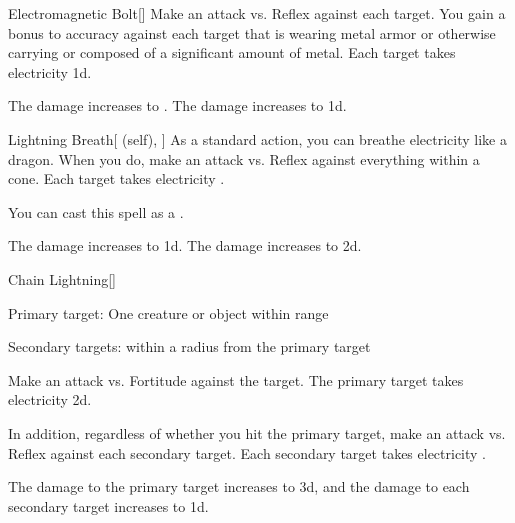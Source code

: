 \lowercase{\hypertarget{spell:Electromagnetic Bolt}{}}\label{spell:Electromagnetic Bolt}
\begin{freeability}[Rank 4]{\hypertarget{spell:Electromagnetic Bolt}{Electromagnetic Bolt}}[]
Make an attack vs. Reflex against each target.
You gain a  bonus to accuracy against each target that is wearing metal armor or otherwise carrying or composed of a significant amount of metal.
\hit Each target takes electricity  \minus1d.

\rankline
{} The damage increases to .
 The damage increases to  \plus1d.

\end{freeability}
\vspace{0.25em}



\lowercase{\hypertarget{spell:Lightning Breath}{}}\label{spell:Lightning Breath}
\begin{attuneability}[Rank 4]{\hypertarget{spell:Lightning Breath}{Lightning Breath}}[ (self), ]
As a standard action, you can breathe electricity like a dragon.
When you do, make an attack vs. Reflex against everything within a \arealarge cone.
\hit Each target takes electricity .

You can cast this spell as a .

\rankline
{} The damage increases to  \plus1d.
 The damage increases to  \plus2d.

\end{attuneability}
\vspace{0.25em}



\lowercase{\hypertarget{spell:Chain Lightning}{}}\label{spell:Chain Lightning}
\begin{freeability}[Rank 5]{\hypertarget{spell:Chain Lightning}{Chain Lightning}}[]

Primary target: One creature or object within \rngmed range
\par\noindent
Secondary targets:  within a \areasmall radius from the primary target

Make an attack vs. Fortitude against the target.
\hit The primary target takes electricity  \plus2d.

In addition, regardless of whether you hit the primary target, make an attack vs. Reflex against each secondary target.
\hit Each secondary target takes electricity .

\rankline
{} The damage to the primary target increases to  \plus3d, and the damage to each secondary target increases to  \plus1d.

\end{freeability}
\vspace{0.25em}



